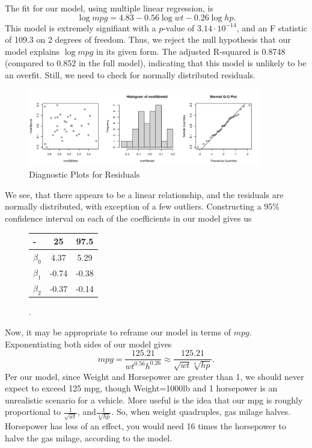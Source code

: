\documentclass[a4paper]{article}
\begin{document}
The fit for our model, using multiple linear regression, is
\begin{equation}
	\log mpg = 4.83 - 0.56 \log wt -0.26\log hp.
\end{equation}
This model is extremely signifiant with a \(p\)-value of \(3.14\cdot 10^{-14}\), and an F statistic of 109.3 on 2 degrees of freedom. Thus, we reject the null hypothesis that our model explains \(\log mpg\) in its given form. The adjusted R-squared is 0.8748 (compared to 0.852 in the full model), indicating that this model is unlikely to be an overfit. Still, we need to check for normally distributed residuals.
\begin{figure}[H]
	\centering
	\includegraphics[width=0.9\textwidth]{"../diag.png"}
	\caption{Diagnostic Plots for Residuals}
	\label{fig:diagnose}
\end{figure}
We see, that there appears to be a linear relationship, and the residuals are normally distributed, with exception of a few outliers. 
Constructing a 95\% confidence interval on each of the coefficients in our model gives us
\begin{figure}[H]
\centering
\begin{tabular}{l|c|c}
	-  & 25 & 97.5 \\
	\hline
	\(\beta_0\) & 4.37 & 5.29 \\
	\hline
	\(\beta_1\) & -0.74 & -0.38 \\
	\hline
	\(\beta_2\) & -0.37 & -0.14
\end{tabular}.
\end{figure}

Now, it may be appropriate to reframe our model in terms of \(mpg\). Exponentiating both sides of our model gives
\begin{equation}
	mpg = \frac{125.21}{wt^{0.56}h^{0.26}} \approx \frac{125.21}{\sqrt{wt}\sqrt[4]{hp} }.
\end{equation}
Per our model, since Weight and Horsepower are greater than 1, we should never expect to exceed 125 mpg, though Weight=1000lb and 1 horsepower is an unrealistic scenario for a vehicle. More useful is the idea that our mpg is roughly proportional to \(\frac{1}{\sqrt{wt} }\), and\(\frac{1}{\sqrt[4]{hp} }\). So, when weight quadruples, gas milage halves. Horsepower has less of an effect, you would need 16 times the horsepower to halve the gas milage, according to the model.
\end{document}
